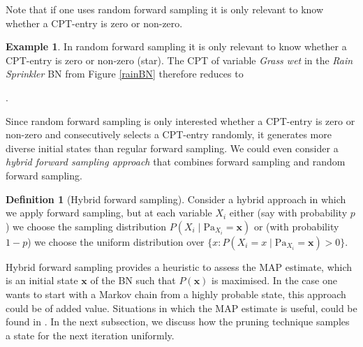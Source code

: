 \documentclass[a4paper, twoside, 11pt]{report}
\newcommand{\bfx}{{\mathbf{x}}}
\theoremstyle{plain}
\theoremstyle{definition}
\newtheorem{definition}[thm]{Definition}
\newtheorem{example}[thm]{Example}
\theoremstyle{remark}
\begin{document}
Note that if one uses random forward sampling it is only relevant to know whether a CPT-entry is zero or non-zero. 
\begin{example}
In random forward sampling it is only relevant to know whether a CPT-entry is zero or non-zero (\gls{star}). The CPT of variable \textit{Grass wet} in the \textit{Rain Sprinkler} BN from Figure \ref{rainBN} therefore reduces to  
\begin{table}[h!]
\centering
{}.
\caption{in order to select a CPT-entry, the random forward sampling approach is only interested whether an entry is zero or non-zero. Consecutively, from all $\star$ CPT-entries it selects one entry randomly.}
\label{block}
\end{table}
\end{example}
Since random forward sampling is only interested whether a CPT-entry is zero or non-zero and consecutively selects a CPT-entry randomly, it generates more diverse initial states than regular forward sampling. We could even consider a \textit{hybrid forward sampling approach} that combines {forward sampling} and {random forward sampling}.
\begin{definition}[Hybrid forward sampling]\label{def:hfs}
Consider a hybrid approach in which we apply forward sampling, but at each variable $X_i$ either (say with probability $p$) we choose the sampling distribution $P(X_i \mid \text{Pa}_{X_i} = \mathbf{x})$ or (with probability $1-p$) we choose the uniform distribution over $\{x : P(X_i = x \mid \text{Pa}_{X_i}=\mathbf{x}) > 0\}$. 
\end{definition}
Hybrid forward sampling provides a heuristic to assess the \gls{MAP} estimate, which is an initial state $\bfx$ of the BN such that $P(\bfx)$ is maximised. In the case one wants to start with a Markov chain from a highly probable state, this approach could be of added value. Situations in which the MAP estimate is useful, could be found in \cite{park2002using}. In the next subsection, we discuss how the pruning technique samples a state for the next iteration uniformly. 
\end{document}
